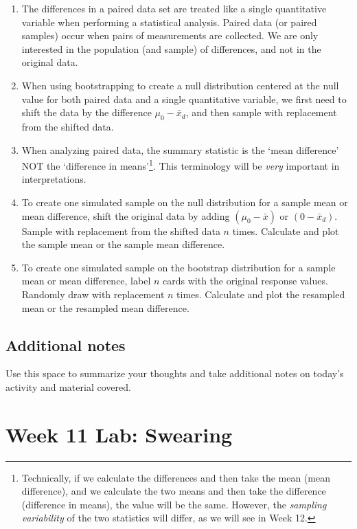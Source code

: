 \documentclass[
]{report}
\begin{document}
\begin{enumerate}
\def\labelenumi{\arabic{enumi}.}
\item
  The differences in a paired data set are treated like a single quantitative variable when performing a statistical analysis. Paired data (or paired samples) occur when pairs of measurements are collected. We are only interested in the population (and sample) of differences, and not in the original data.
\item
  When using bootstrapping to create a null distribution centered at the null value for both paired data and a single quantitative variable, we first need to shift the data by the difference \(\mu_0 - \bar{x}_d\), and then sample with replacement from the shifted data.
\item
  When analyzing paired data, the summary statistic is the `mean difference' NOT the `difference in means'\footnote{Technically, if we calculate the differences and then take the mean (mean difference), and we calculate the two means and then take the difference (difference in means), the value will be the same. However, the \emph{sampling variability} of the two statistics will differ, as we will see in Week 12.}. This terminology will be \emph{very} important in interpretations.
\item
  To create one simulated sample on the null distribution for a sample mean or mean difference, shift the original data by adding \((\mu_0 - \bar{x})\) or \((0 - \bar{x}_d)\). Sample with replacement from the shifted data \(n\) times. Calculate and plot the sample mean or the sample mean difference.
\item
  To create one simulated sample on the bootstrap distribution for a sample mean or mean difference, label \(n\) cards with the original response values. Randomly draw with replacement \(n\) times. Calculate and plot the resampled mean or the resampled mean difference.
\end{enumerate}

\hypertarget{additional-notes-4}{%
\subsection{Additional notes}\label{additional-notes-4}}

Use this space to summarize your thoughts and take additional notes on today's activity and material covered.

\newpage

\hypertarget{week-11-lab-swearing}{%
\section{Week 11 Lab: Swearing}\label{week-11-lab-swearing}}
\end{document}
